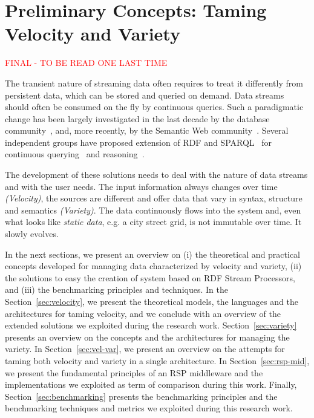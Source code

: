 \chapter{Preliminary Concepts: Taming Velocity and Variety}\label{ch:background}

\textcolor{red}{FINAL - TO BE READ ONE LAST TIME}

The transient nature of streaming data often requires to treat it differently from persistent data, which can be stored and queried on demand. Data streams should often be consumed on the fly by continuous queries. Such a paradigmatic change has been largely investigated in the last decade by the database community~\cite{garofalakis2016data}, and, more recently, by the Semantic Web community~\cite{della2009s}. Several independent groups have proposed extension of RDF and SPARQL~\cite{w3c_sparql} for continuous querying~\cite{Barbieri2010b,DBLP:conf/semweb/PhuocDPH11,DBLP:conf/semweb/CalbimonteCG10} and reasoning~\cite{DBLP:journals/ijsc/BarbieriBCVG10,Anicic2011}. 

\sloppy The development of these solutions needs to deal with the nature of data streams and with the user needs. 
The input information always changes over time \textit{(Velocity)}, the sources are different and offer data that vary in syntax, structure and semantics \textit{(Variety)}. The data continuously flows into the system and, even what looks like \textit{static data}, e.g. a city street grid, is not immutable over time. It slowly evolves.

In the next sections, we present an overview on (i) the theoretical and practical concepts developed for managing data characterized by velocity and variety, (ii) the solutions to easy the creation of system based on RDF Stream Processors, and (iii) the benchmarking principles and techniques.
In the Section~\ref{sec:velocity}, we present the theoretical models, the languages and the architectures for taming velocity, and we conclude with an overview of the extended solutions we exploited during the research work. Section~\ref{sec:variety} presents an overview on the concepts and the architectures for managing the variety.
In Section~\ref{sec:vel-var}, we present an overview on the attempts for taming both velocity and variety in a single architecture.
In Section~\ref{sec:rsp-mid}, we present the fundamental principles of an RSP middleware and the implementations we exploited as term of comparison during this work.
Finally, Section~\ref{sec:benchmarking} presents the benchmarking principles and the benchmarking techniques and metrics we exploited during this research work.

